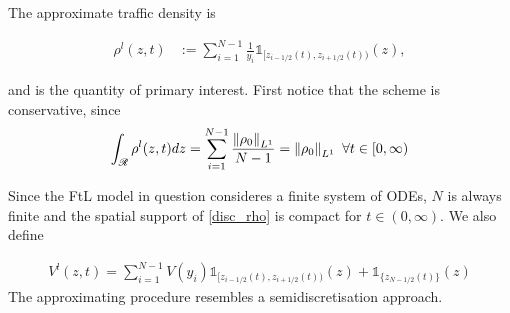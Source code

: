 The approximate traffic density is

\begin{align} \label{disc_rho}
    \rho^l(z,t) &:= \sum_{i = 1}^{N-1} \frac{1}{y_i}\mathbb{1}_{[z_{i - 1/2}(t), z_{i + 1/2}(t))}(z),
\end{align}

and is the quantity of primary interest. First notice that the scheme is conservative, since 
\begin{equation} \label{rho_conservative}
	\int_{\mathscr{R}} \rho^l(z,t) dz = \sum_{i = 1}^{N-1} \frac{\left\lVert\rho_0\right\rVert_{L^1}}{N-1} = \left\lVert\rho_0\right\rVert_{L^1} \, \, \forall t \in [0, \infty)  
\end{equation}


Since the FtL model in question consideres a finite system of ODEs, $N$ is always finite and the spatial support of \eqref{disc_rho} is compact for $t \in (0,\infty)$.  We also define 

\begin{align} \label{disc_V}
    V^l(z,t) = \sum_{i = 1}^{N-1} V(y_i)\mathbb{1}_{[z_{i - 1/2}(t), z_{i + 1/2}(t))}(z) + \mathbb{1}_{\{z_{N-1/2}(t)\}}(z)
\end{align}
The approximating procedure resembles a semidiscretisation approach. 

